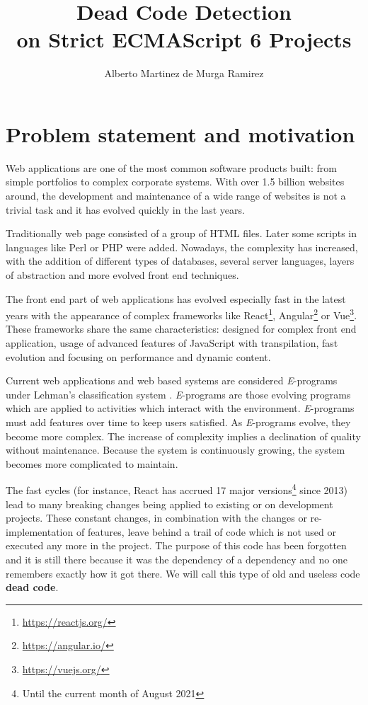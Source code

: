 \documentclass{uvamscse}
\title{Dead Code Detection \\ on Strict ECMAScript 6 Projects}
\author{Alberto Martinez de Murga Ramirez}
\begin{document}
\maketitle
\chapter{Problem statement and motivation}
Web applications are one of the most common software products built: from simple portfolios to complex corporate systems. With over 1.5 billion websites around, the development and maintenance of a wide range of websites is not a trivial task and it has evolved quickly in the last years.

Traditionally web page consisted of a group of HTML files. Later some scripts in languages like Perl or PHP were added. Nowadays, the complexity has increased, with the addition of different types of databases, several server languages, layers of abstraction and more evolved front end techniques.

The front end part of web applications has evolved especially fast in the latest years with the appearance of complex frameworks like React\footnote{\url{https://reactjs.org/}}, Angular\footnote{\url{https://angular.io/}} or Vue\footnote{\url{https://vuejs.org/}}. These frameworks share the same characteristics: designed for complex front end application, usage of advanced features of JavaScript with transpilation, fast evolution and focusing on performance and dynamic content.

Current web applications and web based systems are considered \textit{E}-programs under Lehman's classification system \cite{10.1109/PROC.1980.11805}. \textit{E}-programs are those evolving programs which are applied to activities which interact with the environment. \textit{E}-programs must add features over time to keep users satisfied. As \textit{E}-programs evolve, they become more complex. The increase of complexity implies a declination of quality without maintenance. Because the system is continuously growing, the system becomes more complicated to maintain.

The fast cycles (for instance, React has accrued 17 major versions\footnote{Until the current month of August 2021} since 2013) lead to many breaking changes being applied to existing or on development projects. These constant changes, in combination with the changes or re-implementation of features, leave behind a trail of code which is not used or executed any more in the project. The purpose of this code has been forgotten and it is still there because it was the dependency of a dependency and no one remembers exactly how it got there. We will call this type of old and useless code \textbf{dead code}.
\end{document}
